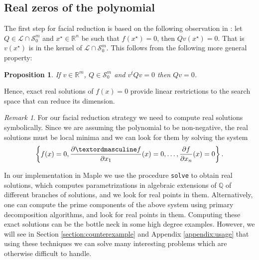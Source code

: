 \documentclass{amsart}
\newtheorem{prop}[theorem]{Proposition}
\theoremstyle{definition}
\theoremstyle{remark}
\newtheorem{remark}[theorem]{Remark}
\numberwithin{equation}{section}
\newcommand{\Sym}{{\mathcal S}}
\newcommand{\eLL}{{\mathcal L}}
\newcommand{\Q}{{\mathbb Q}}
\newcommand{\R}{{\mathbb R}}
\begin{document}


\subsection{Real zeros of the polynomial}
The first step for facial reduction is based on the following observation in \cite{parrilo}: let $Q \in \eLL \cap \Sym_0^m$ and $x^\star \in \R^n$ be such that $f(x^\star) = 0$, then $Q v(x^\star) = 0$. That is $v(x^\star)$ is in the kernel of  $\eLL \cap \Sym_0^m$. This follows from the following more general property:

\begin{prop}
\label{prop:nulleq}
If $v \in \R^m$, $Q \in \Sym_0^m$ and $v^t Q v = 0$ then $Q v = 0$.
\end{prop}

Hence, exact real solutions of $f(x) = 0$ provide linear restrictions to the search space that can reduce its dimension.

\begin{remark}
For our facial reduction strategy we need to compute real solutions symbolically.
Since we are assuming the polynomial to be non-negative, the real solutions must be local minima and we can look for them by solving the system
\[
\left\{f(x) = 0, \frac{\partialº f}{\partial x_1}(x) = 0, \dots, \frac{\partial f}{\partial x_n}(x) = 0\right\}.
\]


In our implementation in Maple we use the procedure \texttt{solve} to obtain real solutions, which computes parametrizations in algebraic extensions of $\Q$ of different branches of solutions, and we look for real points in them. Alternatively, one can compute the prime components of the above system using primary decomposition algorithms, and look for real points in them. Computing these exact solutions can be the bottle neck in some high degree examples. However, we will see in Section \ref{section:counterexample} and Appendix \ref{appendix:usage} that using these techniques we can solve many interesting problems which are otherwise difficult to handle.
\end{remark}
\end{document}
